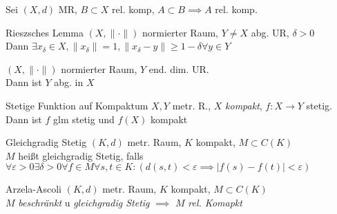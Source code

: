 \begin{lemma}
  Sei \((X,d)\) MR, \(B\subset X\) rel. komp, \(A\subset B \implies A\) rel.
  komp.
\end{lemma}

\begin{satz}{Rieszsches Lemma}
  $(X, \|\cdot\|)$ normierter Raum, $Y \neq X$ abg. UR, $\delta>0$\\
  Dann $\exists x_{\delta} \in X, \|x_{\delta}\| = 1,  \|x_{\delta}-y\|
  \geq 1-\delta \forall y \in Y$
\end{satz}

\begin{lemma}
  $(X, \|\cdot\|)$ normierter Raum, $Y$ end. dim. UR.\\
  Dann ist $Y$ abg. in $X$
\end{lemma}

\begin{satz}{Stetige Funktion auf Kompaktum}
  $X,Y$ metr. R., $X$ \textit{kompakt}, $f:X\to Y$ stetig.\\
  Dann ist $f$ glm stetig und $f(X)$ kompakt
\end{satz}

\begin{definition}{Gleichgradig Stetig}
  $(K,d)$ metr. Raum, $K$ kompakt, $M \subset C(K)$\\
  $M$ heißt gleichgradig Stetig, falls
  $\forall \varepsilon >0 \exists \delta >0 \forall f \in M \forall s,t \in K:
  (d(s,t) < \varepsilon \implies |f(s) - f(t)| < \varepsilon)$
\end{definition}

\begin{satz}{Arzela-Ascoli}
  $(K,d)$ metr. Raum, $K$ kompakt, $M \subset C(K)$\\
  $M$ \textit{beschränkt} u \textit{gleichgradig Stetig} $\implies$ $M$
  \textit{rel. Komapkt}
\end{satz}
